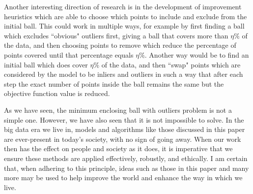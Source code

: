 \documentclass[11pt,twoside]{report}
\theoremstyle{definition}
\numberwithin{theorem}{section}
\numberwithin{definition}{section}
\numberwithin{lemma}{section}
\numberwithin{proposition}{section}
\numberwithin{equation}{section}
\numberwithin{figure}{section}
\begin{document}
Another interesting direction of research is in the development of improvement heuristics which are able to choose which points to include and exclude from the initial ball. This could work in multiple ways, for example by first finding a ball which excludes ``obvious" outliers first, giving a ball that covers more than $\eta\%$ of the data, and then choosing points to remove which reduce the percentage of points covered until that percentage equals $\eta\%$. Another way would be to find an initial ball which does cover $\eta\%$ of the data, and then ``swap" points which are considered by the model to be inliers and outliers in such a way that after each step the exact number of points inside the ball remains the same but the objective function value is reduced.

As we have seen, the minimum enclosing ball with outliers problem is not a simple one. However, we have also seen that it is not impossible to solve. In the big data era we live in, models and algorithms like those discussed in this paper are ever-present in today's society, with no sign of going away. When our work then has the effect on people and society as it does, it is imperative that we ensure these methods are applied effectively, robustly, and ethically. I am certain that, when adhering to this principle, ideas such as those in this paper and many more may be used to help improve the world and enhance the way in which we live.



\clearpage
\end{document}
